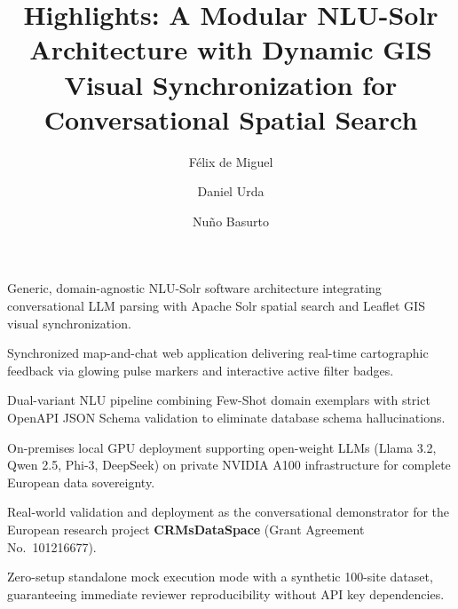 \documentclass[preprint,12pt, a4paper]{elsarticle}
\begin{document}
\begin{frontmatter}

\title{Highlights: A Modular NLU-Solr Architecture with Dynamic GIS Visual Synchronization for Conversational Spatial Search}

\author[1]{F{\'e}lix de Miguel }

\author[1]{Daniel Urda }

\author[1]{Nu{\~n}o Basurto }


\address[1]{Grupo de Inteligencia Computacional Aplicada (GICAP), Departamento de Digitalizaci{\'o}n, Escuela Polit{\'e}cnica Superior, Universidad de Burgos, Av. Cantabria s/n, 09006 Burgos, Spain}

\begin{highlights}
    \item Generic, domain-agnostic NLU-Solr software architecture integrating conversational LLM parsing with Apache Solr spatial search and Leaflet GIS visual synchronization.
    \item Synchronized map-and-chat web application delivering real-time cartographic feedback via glowing pulse markers and interactive active filter badges.
    \item Dual-variant NLU pipeline combining Few-Shot domain exemplars with strict OpenAPI JSON Schema validation to eliminate database schema hallucinations.
    \item On-premises local GPU deployment supporting open-weight LLMs (Llama 3.2, Qwen 2.5, Phi-3, DeepSeek) on private NVIDIA A100 infrastructure for complete European data sovereignty.
    \item Real-world validation and deployment as the conversational demonstrator for the European research project \textbf{CRMsDataSpace} (Grant Agreement No.~101216677).
    \item Zero-setup standalone mock execution mode with a synthetic 100-site dataset, guaranteeing immediate reviewer reproducibility without API key dependencies.
\end{highlights}

\end{frontmatter}
\end{document}

